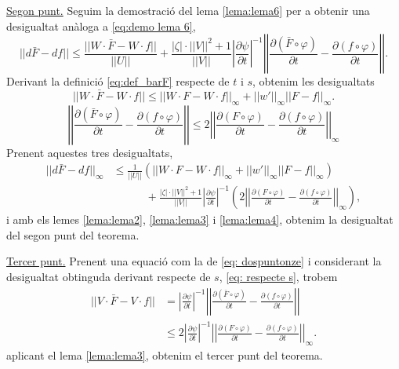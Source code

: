 {\underline{Segon punt.}
Seguim la demostració del lema \ref{lema:lema6} per a obtenir una desigualtat anàloga a \ref{eq:demo lema 6},
\begin{equation*}
    ||d\bar F-df||\le \frac{||W\cdot\bar F - W\cdot f||}{||U||} + \frac{|\zeta|\cdot||V||^2+1}{||V||}\left|\frac{\partial\psi}{\partial t}\right|^{-1} \left|\left| \frac{\partial(\bar F\circ\varphi)}{\partial t} - \frac{\partial(f\circ\varphi)}{\partial t} \right|\right|.
\end{equation*}
Derivant la definició \ref{eq:def_barF} respecte de $t$ i $s$, obtenim les desigualtats
\begin{equation}\label{eq: respecte t}
    ||W\cdot\bar F - W\cdot f|| \le ||W\cdot F - W\cdot f||_\infty + ||w'||_\infty||F - f||_\infty.
\end{equation}
\begin{equation}\label{eq: respecte s}
    \left|\left| \frac{\partial(\bar F\circ\varphi)}{\partial t} - \frac{\partial(f\circ\varphi)}{\partial t} \right|\right| \le 2\left|\left| \frac{\partial(F\circ\varphi)}{\partial t} - \frac{\partial(f\circ\varphi)}{\partial t} \right|\right|_\infty
\end{equation}
Prenent aquestes tres desigualtats, 
\begin{align*}
    ||d\bar F-df||_\infty
    &\le\frac{1}{||U||}\left(||W\cdot F - W\cdot f||_\infty + ||w'||_\infty||F - f||_\infty\right) 
    \\&\quad\quad\quad+ \frac{|\zeta|\cdot||V||^2+1}{||V||}\left|\frac{\partial\psi}{\partial t}\right|^{-1}\left( 2\left|\left| \frac{\partial(F\circ\varphi)}{\partial t} - \frac{\partial(f\circ\varphi)}{\partial t} \right|\right|_\infty\right),
\end{align*}
i amb els lemes \ref{lema:lema2}, \ref{lema:lema3} i \ref{lema:lema4}, obtenim la desigualtat del segon punt del teorema.

\underline{Tercer punt.}
Prenent una equació com la de \ref{eq: dospuntonze} i considerant la desigualtat obtinguda derivant respecte de $s$, \ref{eq: respecte s}, trobem
\begin{align*}
    ||V\cdot \bar F - V\cdot f|| &= \left|\frac{\partial\psi}{\partial t}\right|^{-1} \left|\left| \frac{\partial(\bar F\circ\varphi)}{\partial t} - \frac{\partial(f\circ\varphi)}{\partial t} \right|\right|\\
    &\le 2\left|\frac{\partial\psi}{\partial t}\right|^{-1} \left|\left| \frac{\partial(F\circ\varphi)}{\partial t} - \frac{\partial(f\circ\varphi)}{\partial t} \right|\right|_\infty.
\end{align*}
aplicant el lema \ref{lema:lema3}, obtenim el tercer punt del teorema.

}
